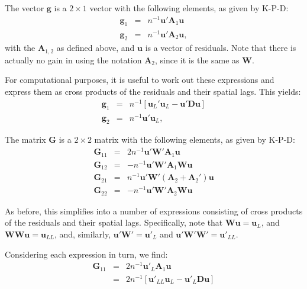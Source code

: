 \documentclass{article}
\begin{document}
The vector $\mathbf{g}$ is a $2 \times 1$ vector with the following elements,
as given by K-P-D:
\begin{eqnarray}
 \mathbf{g}_1 &=& n^{-1} \mathbf{u}' \mathbf{A}_1 \mathbf{u} \label{eq:g1} \\
  \mathbf{g}_2 &=& n^{-1} \mathbf{u}' \mathbf{A}_2 \mathbf{u}, \label{eq:g2}
\end{eqnarray}
with the $\mathbf{A}_{1,2}$ as defined above, and $\mathbf{u}$ is a vector
of residuals. Note that there is actually no gain in using the notation $\mathbf{A}_2$,
since it is the same as $\mathbf{W}$.

For computational purposes, it is useful to work out these
expressions and express them as cross products of the residuals and their
spatial lags. This yields:
\begin{eqnarray*}
 \mathbf{g}_1 &=& n^{-1} [ \mathbf{u}_L' \mathbf{u}_L - \mathbf{u}' \mathbf{D} \mathbf{u} ]\\
  \mathbf{g}_2 &=& n^{-1} \mathbf{u}' \mathbf{u}_L,
\end{eqnarray*}

The matrix $\mathbf{G}$ is a $2 \times 2$ matrix with the following elements,
as given by K-P-D:
\begin{eqnarray}
\mathbf{G}_{11} &=& 2n^{-1} \mathbf{u}' \mathbf{W'} \mathbf{A}_1 \mathbf{u} \label{eq:g11}\\
\mathbf{G}_{12} &=& - n^{-1} \mathbf{u}' \mathbf{W'} \mathbf{A}_1 \mathbf{W} \mathbf{u} \label{eq:g12}\\
\mathbf{G}_{21} &=& n^{-1} \mathbf{u}' \mathbf{W'} ( \mathbf{A}_2 + \mathbf{A}_2 ' ) \mathbf{u} \label{eq:g21} \\
\mathbf{G}_{22} &=& - n^{-1} \mathbf{u}' \mathbf{W'} \mathbf{A}_2 \mathbf{W} \mathbf{u} \label{eq:g22}
\end{eqnarray}

As before, this simplifies into a number of expressions consisting of cross products
of the residuals and their spatial lags. Specifically, note that $\mathbf{Wu} = \mathbf{u}_L$,
and $\mathbf{WWu} = \mathbf{u}_{LL}$, and, similarly, $\mathbf{u'W'} = \mathbf{u'}_L$
and $\mathbf{u'W'W'} = \mathbf{u'}_{LL}$.

Considering each expression in turn, we find:
\begin{eqnarray}
\mathbf{G}_{11} &=& 2 n^{-1} \mathbf{u'}_L \mathbf{A}_1 \mathbf{u}\label{eq:G11}\\
    &=& 2 n^{-1} [ \mathbf{u'}_{LL} \mathbf{u}_L - \mathbf{u'}_L \mathbf{D} \mathbf{u} ]\nonumber
\end{eqnarray}
\end{document}
